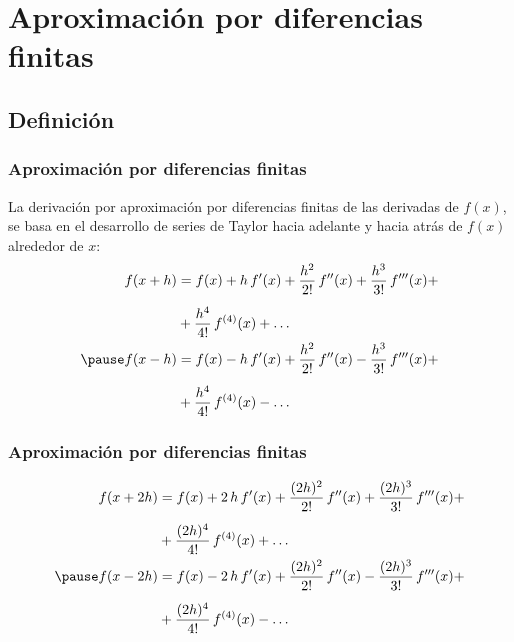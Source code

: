 \documentclass[12pt]{beamer}
\begin{document}
\section{Aproximación por diferencias finitas}
\subsection{Definición}

\begin{frame}
\frametitle{Aproximación por diferencias finitas}
La derivación por aproximación por diferencias finitas de las derivadas de $f (x)$, se basa en el desarrollo de series de Taylor hacia adelante y hacia atrás de $f (x)$ alrededor de $x$:
\pause
\begin{eqnarray*}
\begin{aligned}
f (x + h) &= f(x) + h \, \pderivada{f} (x) + \dfrac{h^{2}}{2!} \, \sderivada{f} (x) + \dfrac{h^{3}}{3!} \, \tderivada{f} (x) + \\[0.5em]
&+ \dfrac{h^{4}}{4!} \, f^{(4)} (x) + \ldots \\ \pause
f (x - h) &= f(x) - h \, \pderivada{f} (x) + \dfrac{h^{2}}{2!} \, \sderivada{f} (x) - \dfrac{h^{3}}{3!} \, \tderivada{f} (x) + \\[0.5em]
&+ \dfrac{h^{4}}{4!} \, f^{(4)}(x) - \ldots
\end{aligned}
\end{eqnarray*}
\end{frame}
\begin{frame}
\frametitle{Aproximación por diferencias finitas}
\begin{eqnarray*}
\begin{aligned}
f (x + 2 h) &= f(x) + 2 \, h \, \pderivada{f} (x) + \dfrac{(2 h)^{2}}{2!} \, \sderivada{f} (x) + \dfrac{(2 h)^{3}}{3!} \, \tderivada{f} (x) + \\[0.5em]
&+ \dfrac{(2 h)^{4}}{4!} \, f^{(4)}(x) + \ldots \\ \pause
f( x - 2 h) &= f(x) - 2 \, h \, \pderivada{f} (x) + \dfrac{(2 h)^{2}}{2!} \, \sderivada{f} (x) - \dfrac{(2 h)^{3}}{3!} \, \tderivada{f} (x) + \\[0.5em]
&+  \dfrac{(2 h)^{4}}{4!} \, f^{(4)}(x) - \ldots
\end{aligned}
\end{eqnarray*}
\end{frame}
\end{document}
